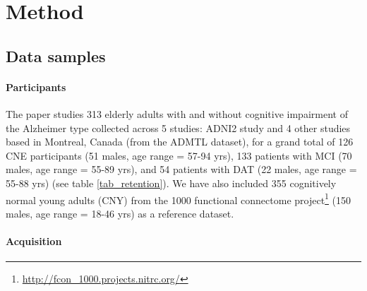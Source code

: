 \documentclass[authoryear]{elsarticle}
\begin{document}
\section{Method}

\subsection{Data samples} 
\paragraph{Participants}
The paper studies 313 elderly adults with and without cognitive impairment of the Alzheimer type collected across 5 studies: ADNI2 study and 4 other studies based in Montreal, Canada (from the ADMTL dataset), for a grand total of 126 CNE participants (51 males, age range = 57-94 yrs), 133 patients with MCI (70 males, age range = 55-89 yrs), and 54 patients with DAT (22 males, age range = 55-88 yrs) (see table \ref{tab_retention}).
We have also included 355 cognitively normal young adults (CNY) from the 1000 functional connectome project\footnote{\url{http://fcon_1000.projects.nitrc.org/}} (150 males, age range = 18-46 yrs) as a reference dataset.

\paragraph{Acquisition} %
\end{document}
